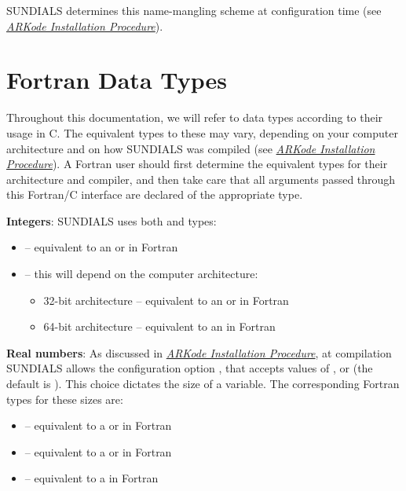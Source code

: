 \documentclass[letterpaper,10pt,english]{sphinxmanual}
\begin{document}
SUNDIALS determines this name-mangling scheme at configuration time
(see {\hyperref[Install:installation]{\emph{ARKode Installation Procedure}}}).


\section{Fortran Data Types}
\label{f_interface/index:fortran-data-types}\label{f_interface/index:finterface-datatypes}
Throughout this documentation, we will refer to data types according
to their usage in C.  The equivalent types to these may vary,
depending on your computer architecture and on how SUNDIALS was
compiled (see {\hyperref[Install:installation]{\emph{ARKode Installation Procedure}}}).  A Fortran user should first
determine the equivalent types for their architecture and compiler,
and then take care that all arguments passed through this Fortran/C
interface are declared of the appropriate type.

\textbf{Integers}: SUNDIALS uses both  and  types:
\begin{itemize}
\item {} 
 -- equivalent to an  or  in Fortran

\item {} 
 -- this will depend on the computer architecture:
\begin{itemize}
\item {} 
32-bit architecture -- equivalent to an  or  in Fortran

\item {} 
64-bit architecture -- equivalent to an  in Fortran

\end{itemize}

\end{itemize}

\textbf{Real numbers}:  As discussed in {\hyperref[Install:installation]{\emph{ARKode Installation Procedure}}}, at compilation
SUNDIALS allows the configuration option  ,
that accepts values of ,  or  (the
default is ).  This choice dictates the size of a
 variable.  The corresponding Fortran types for these
 sizes are:
\begin{itemize}
\item {} 
 -- equivalent to a  or  in Fortran

\item {} 
 -- equivalent to a  or  in Fortran

\item {} 
 -- equivalent to a  in Fortran

\end{itemize}
\end{document}
